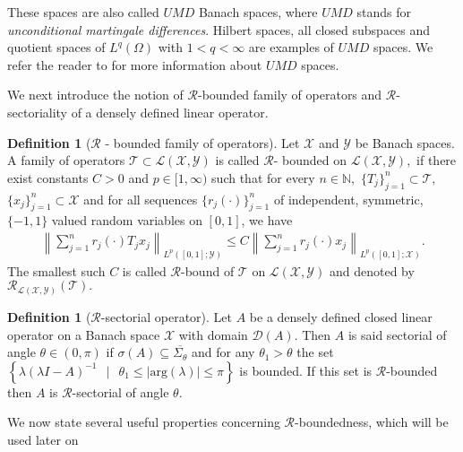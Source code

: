 \documentclass[12pt,a4paper,reqno]{amsart}
\theoremstyle{definition}
\newtheorem{definition}[theorem]{Definition}
\theoremstyle{remark}
\numberwithin{equation}{section}
\newcommand{\ds}{\displaystyle}
\newcommand{\mx}{\mathcal{X}}
\newcommand{\my}{\mathcal{Y}}
\newcommand{\mr}{\mathcal{R}}
\begin{document}
These spaces are also called $UMD$ Banach spaces, where $UMD$ stands for \textit{unconditional martingale differences}.  Hilbert spaces, all closed subspaces and quotient spaces of $L^{q}(\Omega)$ with $1 < q  < \infty$ are examples of $UMD$ spaces. We refer the reader to \cite[pp. 141-147]{Amann} for more information about $UMD$ spaces.

We next introduce the notion of $\mathcal{R}$-bounded  family of operators and $\mathcal{R}$-sectoriality of a densely defined linear operator.
\begin{definition} [${\mathcal R}$ - bounded family of operators]
Let $\mx$ and $\my$ be  Banach spaces. A family of operators $\mathcal{T} \subset \mathcal{L}(\mx,\my)$ is called $\mathcal{R}$- bounded on $\mathcal{L}(\mx,\my),$ if there exist constants $C >0$ and $p \in [1,\infty)$ such that for every $n \in \mathbb{N},$ $\{T_{j}\}_{j=1}^{n} \subset \mathcal{T},$ $\{x_{j}\}_{j=1}^{n} \subset \mx$  and for all sequences $\{r_{j}(\cdot)\}_{j=1}^{n}$ of independent, symmetric, $\{ -1,1\}$ valued random variables on $[0,1]$, we have
\begin{align*}
\left\|\sum_{j=1}^{n}r_{j}(\cdot) T_{j} x_{j}\right\|_{L^{p}([0,1];\my)} \leqslant C \left\|\sum_{j=1}^{n}r_{j}(\cdot)  x_{j}\right\|_{L^{p}([0,1];\mx)}.
\end{align*}
The smallest such $C$ is called ${\mathcal R}$-bound of $\mathcal{T}$ on $\mathcal{L}(\mx,\my)$ and denoted by $\mathcal{R}_{\mathcal{L}(\mx,\my)}(\mathcal{T}).$
\end{definition}

\begin{definition}[$\mathcal{R}$-sectorial operator]
Let $A$ be a densely defined closed linear operator on a Banach space $\mx$ with domain $\mathcal{D}(A).$ Then $A$ is said sectorial of angle $\theta \in (0,\pi)$ if $\sigma(A) \subseteq \overline{\Sigma_{\theta}}$ and  for any $\theta_{1} > \theta$ the set $\ds \left\{\lambda(\lambda I -  A)^{-1} \ \ \mid \ \ \theta_{1} \leqslant |\mathrm{arg}(\lambda)| \leqslant \pi \right\}$ is bounded. If this set is $\mr$-bounded then $A$ is $\mr$-sectorial of angle $\theta.$
\end{definition}

We now state several useful properties concerning $\mathcal{R}$-boundedness, which will be used later on
\end{document}
